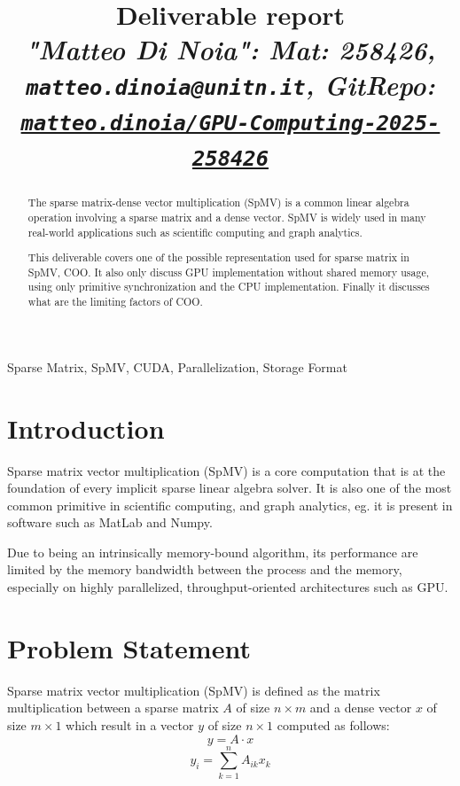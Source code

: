 \documentclass[conference]{IEEEtran}
\newcommand{\torem}[1]{\color{olive} #1 \color{black}}
\begin{document}
\title{Deliverable report \\
\footnotesize \textit{"Matteo Di Noia": Mat: 258426, \texttt{matteo.dinoia@unitn.it}, GitRepo: \texttt{\href{https://github.com/matteo-dinoia/GPU-Computing-2025-258426}{matteo.dinoia/GPU-Computing-2025-258426}}}}

\maketitle

\begin{abstract}
The sparse matrix-dense vector multiplication (SpMV) is a common linear algebra operation involving a sparse matrix and a dense vector. SpMV is widely used in many real-world applications such as scientific computing and graph analytics.

This deliverable covers one of the possible representation used for sparse matrix in SpMV, COO. It also only discuss GPU implementation without shared memory usage, using only primitive synchronization and the CPU implementation. Finally it discusses what are the limiting factors of COO.
\end{abstract}

\begin{IEEEkeywords}
Sparse Matrix, SpMV, CUDA, Parallelization, Storage Format
\end{IEEEkeywords}

\section{Introduction}

Sparse matrix vector multiplication (SpMV) is a core computation that is at the foundation of every implicit sparse linear algebra solver. It is also one of the most common primitive in scientific computing, and graph analytics, eg. it is present in software such as MatLab and Numpy.

Due to being an intrinsically memory-bound algorithm, its performance are limited by the memory bandwidth between the process and the memory, especially on highly parallelized, throughput-oriented architectures such as GPU.


\section{Problem Statement}
Sparse matrix vector multiplication (SpMV) is defined as the matrix multiplication between a sparse matrix $A$ of size $n\times m$ and a dense vector $x$ of size $m\times 1$ which result in a vector $y$ of size $n\times 1$ computed as follows:
\[y=A \cdot x\]
\[y_i = \sum_{k=1}^{n}A_{ik} x_{k}\]
\end{document}
